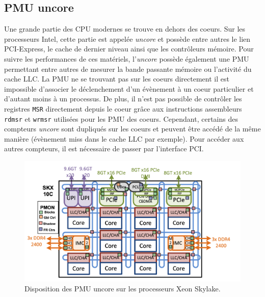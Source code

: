     \subsection{PMU uncore}\label{sec:edl_perf_uncore}
    
    
        Une grande partie des CPU modernes se trouve en dehors des coeurs. Sur les processeurs Intel, cette partie est appelée \textit{uncore} et possède entre autres le lien PCI-Express, le cache de dernier niveau ainsi que les contrôleurs mémoire. Pour suivre les performances de ces matériels, l'\textit{uncore} possède également une PMU permettant entre autres de mesurer la bande passante mémoire ou l'activité du cache LLC. La PMU ne se trouvant pas sur les coeurs directement il est impossible d'associer le déclenchement d'un évènement à un coeur particulier et d'autant moins à un processus. De plus, il n'est pas possible de contrôler les registres \verb|MSR| directement depuis le coeur grâce aux instructions assembleurs \verb|rdmsr| et \verb|wrmsr| utilisées pour les PMU des coeurs. Cependant, certains des compteurs \textit{uncore} sont dupliqués sur les coeurs et peuvent être accédé de la même manière (évènement \gls{miss} dans le cache LLC par exemple). Pour accéder aux autres compteurs, il est nécessaire de passer par l'interface PCI.
        
         
        \begin{figure}
        \center
        \includegraphics[width=12cm]{images/edl_perf_uncore_intel_skl.png}
        \caption{\label{fig:edl_perf_uncore_intel_skl} Disposition des PMU uncore sur les processeurs Xeon Skylake. \protect\footnotemark}
        \end{figure}
    
        

